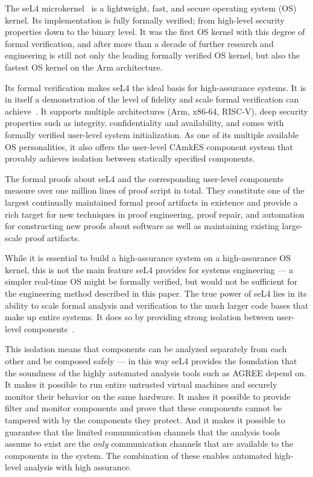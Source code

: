 
The seL4 microkernel~\cite{sel4-sosp09} is a lightweight, fast, and secure
operating system (OS) kernel. Its implementation is fully formally verified;
from high-level security properties down to the binary level. It was the first
OS kernel with this degree of formal verification, and after more than a decade
of further research and engineering is still not only the leading formally
verified OS kernel, but also the fastest OS kernel on the Arm architecture.

Its formal verification makes seL4 the ideal basis for high-assurance systems.
It is in itself a demonstration of the level of fidelity and scale formal
verification can achieve~\cite{sel4-tocs14}. It supports multiple architectures
(Arm, x86-64, RISC-V), deep security properties such as integrity,
confidentiality and availability, and comes with formally verified user-level
system initialization. As one of its multiple available OS personalities, it
also offers the user-level CAmkES component system that provably achieves isolation
between statically specified components.

The formal proofs about seL4 and the corresponding user-level components measure
over one million lines of proof script in total. They constitute one of the
largest continually maintained formal proof artifacts in existence and provide a
rich target for new techniques in proof engineering, proof repair, and
automation for constructing new proofs about software as well as maintaining
existing large-scale proof artifacts.

While it is essential to build a high-assurance system on a high-assurance OS
kernel, this is not the main feature seL4 provides for systems engineering --- a
simpler real-time OS might be formally verified, but would not be sufficient for the
engineering method described in this paper. The true power of seL4 lies in its
ability to scale formal analysis and verification to the much larger code bases
that make up entire systems. It does so by providing strong isolation between
user-level components~\cite{sel4-cacm18}.

This isolation means that components can be analyzed separately from each other
and be composed safely --- in this way seL4 provides the foundation that the soundness of the highly
automated analysis tools such as AGREE depend on. It makes it possible to run
entire untrusted virtual machines and securely monitor their behavior on the
same hardware. It makes it possible to provide filter and monitor components and
prove that these components cannot be tampered with by the components they protect.
And it makes it possible to guarantee that the limited communication channels that the analysis tools
assume to exist are the \emph{only} communication channels that are available to the
components in the system. The combination of these enables automated
high-level analysis with high assurance.

